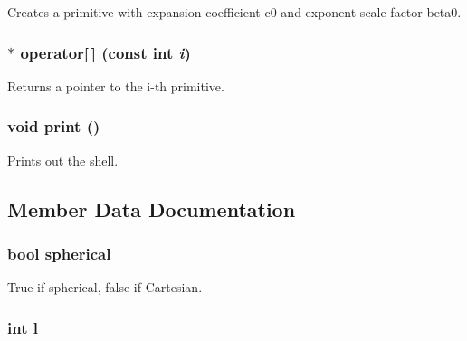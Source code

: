 Creates a primitive with expansion coefficient c0 and exponent scale factor beta0. \hypertarget{classJKBuilder_1_1Shell_ae98a68bcb237e53c8c063aded1b34f2e}{
\subsubsection[{operator[]}]{ $\ast$ operator\mbox{[}$\,$\mbox{]} (const int {\em i})}}
\label{classJKBuilder_1_1Shell_ae98a68bcb237e53c8c063aded1b34f2e}


Returns a pointer to the i-\/th primitive. \hypertarget{classJKBuilder_1_1Shell_a388f572c62279f839ee138a9afbdeeb5}{
\subsubsection[{print}]{\setlength{\rightskip}{0pt plus 5cm}void print ()}}
\label{classJKBuilder_1_1Shell_a388f572c62279f839ee138a9afbdeeb5}


Prints out the shell. 

\subsection{Member Data Documentation}
\hypertarget{classJKBuilder_1_1Shell_a8a5f217a40aac0ce092effdd9b6db9f6}{
\subsubsection[{spherical}]{\setlength{\rightskip}{0pt plus 5cm}bool {\bf spherical}}}
\label{classJKBuilder_1_1Shell_a8a5f217a40aac0ce092effdd9b6db9f6}


True if spherical, false if Cartesian. \hypertarget{classJKBuilder_1_1Shell_a89606eca6b563ec68d2da2e84657736f}{
\subsubsection[{l}]{\setlength{\rightskip}{0pt plus 5cm}int {\bf l}}}
\label{classJKBuilder_1_1Shell_a89606eca6b563ec68d2da2e84657736f}


